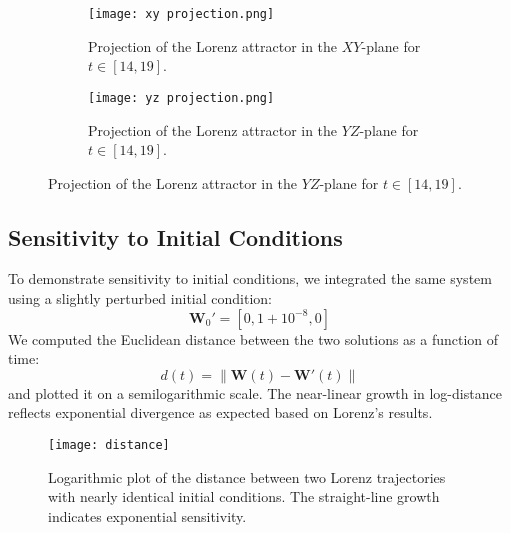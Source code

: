 \documentclass[10pt]{article}
\begin{document}
\begin{figure}[H]
    \centering
    \begin{subfigure}{0.48\textwidth}
        \centering
        \texttt{[image: xy projection.png]}
        \caption{Projection of the Lorenz attractor in the \( XY \)-plane for \( t \in [14, 19] \).}
        \label{fig:xy projection}
    \end{subfigure}
    \hfill
    \begin{subfigure}{0.48\textwidth}
        \centering
        \texttt{[image: yz projection.png]}
        \caption{Projection of the Lorenz attractor in the \( YZ \)-plane for \( t \in [14, 19] \).}
        \label{fig:yz projection}
    \end{subfigure}
\end{figure}

\subsection*{Sensitivity to Initial Conditions}

To demonstrate sensitivity to initial conditions, we integrated the same system using a slightly perturbed initial condition:
\[
\mathbf{W}_0' = [0, 1 + 10^{-8}, 0]
\]
We computed the Euclidean distance between the two solutions as a function of time:
\[
d(t) = \|\mathbf{W}(t) - \mathbf{W}'(t)\|
\]
and plotted it on a semilogarithmic scale. The near-linear growth in log-distance reflects exponential divergence as expected based on Lorenz's results.

\begin{figure}[H]
    \centering
    \texttt{[image: distance]}
    \caption{Logarithmic plot of the distance between two Lorenz trajectories with nearly identical initial conditions. The straight-line growth indicates exponential sensitivity.}
    \label{fig:lorenz_divergence}
\end{figure}
\end{document}
